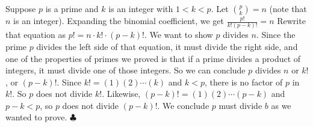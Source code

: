 \begin{Solution}{30.7}

Suppose $p$ is a prime and $k$ is an integer with $1<k<p$.
Let $\binom{p}{k} = n$ (note that $n$ is an integer). Expanding the binomial coefficient, we get $\frac{p!}{k!(p-k)!}  = n$
Rewrite that equation as $p! = n\cdot k! \cdot (p-k)!$. We want to show $p$ divides $n$.  Since the prime $p$ divides the left side of that equation, it must divide the right side, and one of the properties of primes we proved is that if a prime divides a product of integers, it must divide one of those integers. So we can conclude $p$ divides $n$ or $k!$, or $(p-k)!$. Since
$k! = (1)(2)\cdots (k)$ and $k<p$, there is no factor of $p$ in $k!$. So $p$ does not divide $k!$. Likewise,
$(p-k)! = (1)(2)\cdots (p-k)$ and $p-k<p$, so $p$ does not divide $(p-k)!$. We conclude $p$ must divide $b$ as we wanted to prove. $\clubsuit$

\end{Solution}
